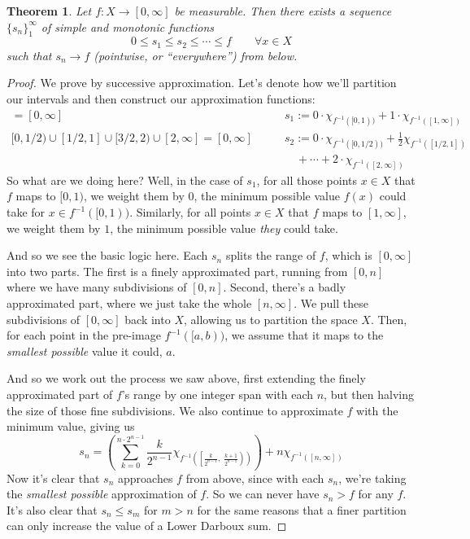 \documentclass[12pt]{article}
\theoremstyle{plain}
\newtheorem{thm}{Theorem}[subsection]
\theoremstyle{definition}
\theoremstyle{remark}
\begin{document}
\begin{thm}
\label{lebapprox}
Let $f: X\rightarrow[0,\infty]$ be measurable. Then there exists a sequence $\{s_n\}^\infty_1$ of simple and monotonic functions 
\[
    0 \leq s_1 \leq s_2 \leq \cdots \leq f 
    \qquad \forall x\in X
\]
such that $s_n\rightarrow f$ (pointwise, or ``everywhere'') from below.
\end{thm}
\begin{proof}
We prove by successive approximation. Let's denote how we'll partition our intervals and then construct our approximation functions:
\begin{align*}
    [0,1) \cup [1,\infty] = [0,\infty] \quad&\quad  
        s_1 := 0\cdot \chi_{f^{-1}([0,1) )}
        + 1 \cdot \chi_{f^{-1}([1,\infty] )} \\
    [0,1/2) \cup [1/2,1] \cup [3/2, 2)
        \cup [2, \infty] = [0,\infty] \quad&\quad  
        s_2 := 0\cdot \chi_{f^{-1}([0,1/2) )}
        + \frac{1}{2} \chi_{f^{-1}([1/2,1] )} \\
    &\qquad
        + \cdots
        + 2 \cdot \chi_{f^{-1}([2,\infty] )} 
\end{align*}
So what are we doing here? Well, in the case of $s_1$, for all those points $x\in X$ that $f$ maps to $[0,1)$, we weight them by $0$, the minimum possible value $f(x)$ could take for $x\in f^{-1}([0,1))$. Similarly, for all points $x\in X$ that $f$ maps to $[1,\infty]$, we weight them by $1$, the minimum possible value \emph{they} could take.  

And so we see the basic logic here. Each $s_n$ splits the range of $f$, which is $[0,\infty]$ into two parts. The first is a finely approximated part, running from $[0,n]$ where we have many subdivisions of $[0,n]$. Second, there's a badly approximated part, where we just take the whole $[n,\infty]$. We pull these subdivisions of $[0,\infty]$ back into $X$, allowing us to partition the space $X$. Then, for each point in the pre-image $f^{-1}([a,b))$, we assume that it maps to the \emph{smallest possible} value it could, $a$.

And so we work out the process we saw above, first extending the finely approximated part of $f$'s range by one integer span with each $n$, but then halving the size of those fine subdivisions. We also continue to approximate $f$ with the minimum value, giving us
\[
    s_n = \left(\sum^{n\cdot 2^{n-1}}_{k=0}\frac{k}{2^{n-1}}
    \chi_{f^{-1}\left( \left[\frac{k}{2^{n-1}}, \;
        \frac{k+1}{2^{n-1}} \right)\right)}\right)
        + n \chi_{f^{-1}\left([n,\infty]\right)}
\]
Now it's clear that $s_n$ approaches $f$ from above, since with each $s_n$, we're taking the \emph{smallest possible} approximation of $f$. So we can never have $s_n>f$ for any $f$. It's also clear that $s_n\leq s_m$ for $m>n$ for the same reasons that a finer partition can only increase the value of a Lower Darboux sum.


\end{proof}
\end{document}
